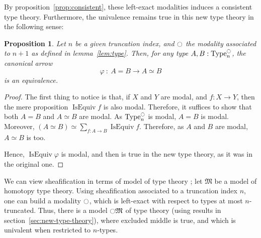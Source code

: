 \documentclass[preprint,9pt,numbers]{sigplanconf}
\newtheorem{prop}[thm]{Proposition}
\newcommand \defeq {\overset{de\hspace{-0.2ex}f}{=}}
\DeclareMathOperator{\Type}{Type}
\DeclareMathOperator{\HProp}{HProp}
\DeclareMathOperator{\nat}{nat}
\DeclareMathOperator{\IsEquiv}{IsEquiv}
\newcommand{\modal}{\ensuremath{\ocircle}}
\newcommand \True {\mathrm{true}}
\newcommand \two {\mathbf{2}}
\newenvironment{mymath}[1][-0em]{%
  \newcommand\mymathaux{\vspace{#1}}%
  \vspace{#1}%
  \begin{equation*}%
  }{ %
    \mymathaux%
  \end{equation*}}
\begin{document}
By proposition~\ref{prop:consistent}, these left-exact modalities
induces a consistent type theory. Furthermore, the univalence remains
true in this new type theory in the following sense:
\begin{prop}
  Let $n$ be a given truncation index, and $\modal$ the modality
  associated to $n+1$ as defined in lemma~\ref{lem:type}. Then, for
  any type $A,B:\Type_n^\modal$, the canonical arrow
  $$\varphi~:~A = B \to A\simeq B$$
  is an equivalence.
\end{prop}
\begin{proof}
  The first thing to notice is that, if $X$ and $Y$ are modal, and
  $f:X \to Y$, then the mere proposition $\IsEquiv f$ is also modal.
  Therefore, it suffices to show that both $A=B$ and $A\simeq B$ are
  modal. As $\Type_n^\modal$ is modal, $A=B$ is modal. 
  Moreover, $(A\simeq B) \simeq \sum_{f:A\to B} \IsEquiv
  f$. Therefore, as $A$ and $B$ are modal, $A\simeq B$ is too. 

  Hence, $\IsEquiv \varphi$ is modal, and then is true in the new type
  theory, as it was in the original one.
\end{proof}

We can view sheafification in terms of model of type theory ; let
$\mathfrak M$ be a model of homotopy type theory. Using sheafification
associated to a truncation index $n$, one can build a modality
$\modal$, which is left-exact with respect to types at most
$n$-truncated. Thus, there is a model $\modal \mathfrak M$ of type
theory (using results in section~\ref{sec:new-type-theory}), where
excluded middle is true, and which is univalent when restricted to $n$-types. 



\end{document}
